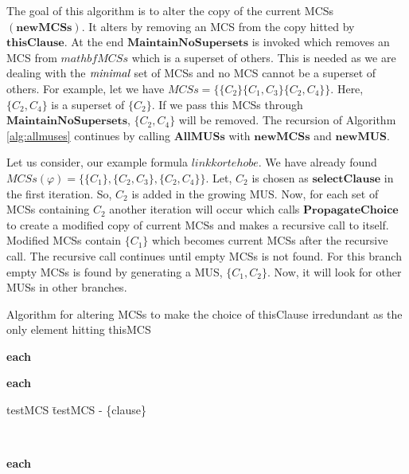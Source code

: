 The goal of this algorithm is to alter the copy of the current MCSs $(\mathbf{newMCSs})$. It alters by removing an MCS from the copy hitted by $\mathbf{thisClause}$. At the end $\mathbf{MaintainNoSupersets}$ is invoked which removes an MCS from $mathbf{MCSs}$ which is a superset of others. This is needed as we are dealing with the $\emph{minimal}$ set of MCSs and no MCS cannot be a superset of others. For example, let we have $MCSs=\{\{C_{2}\}\{C_{1}, C_{3}\}\{C_{2},C_{4}\}\}$. Here, $\{C_{2},C_{4}\}$ is a superset of $\{C_{2}\}$. If we pass this MCSs through $\mathbf{MaintainNoSupersets}$, $\{C_{2},C_{4}\}$ will be removed.\newline
The recursion of Algorithm \ref{alg:allmuses} continues by calling $\mathbf{AllMUSs}$ with $\mathbf{newMCSs}$ and $\mathbf{newMUS}$.
\begin{example}
	Let us consider, our example formula $link korte hobe$. We have already found $MCSs(\varphi)=\{\{C_{1}\}, \{C_{2}, C_{3}\}, \{C_{2}, C_{4}\}\}$. Let, $C_{2}$ is chosen as $\mathbf{selectClause}$ in the first iteration. So, $C_{2}$ is added in the growing MUS. Now, for each set of MCSs containing $C_{2}$ another iteration will occur which calls $\mathbf{PropagateChoice}$ to create a modified copy of current MCSs and makes a recursive call to itself. Modified MCSs contain $\{C_{1}\}$ which becomes current MCSs after the recursive call. The recursive call continues until empty MCSs is not found. For this branch empty MCSs is found by generating a MUS, $\{C_{1}, C_{2}\}$. Now, it will look for other MUSs in other branches.\newline
\begin{Algorithm}
	\caption{Algorithm for altering MCSs to make the choice of thisClause irredundant as the only element hitting thisMCS}
	\label{alg:propagatechoise}
	\begin{algorithm}{}{}
		\begin{FOR}{\textbf{each} }
			\begin{FOR}{\textbf{each} }
				\begin{IF}{}
					testMCS \= testMCS - \{clause\} \\
				\end{IF}
			\end{FOR}
		\end{FOR} \\
		\begin{FOR}{\textbf{each} }

\end{FOR}
\end{algorithm}
\end{Algorithm}
\end{example}
